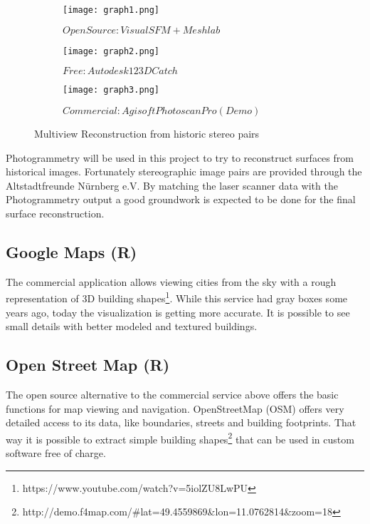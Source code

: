 \begin{figure}[h]
	\centering
	\begin{subfigure}[b]{0.3\textwidth}
		\centering
		\texttt{[image: graph1.png]}
		\caption{$OpenSource: Visual SFM + Meshlab$}
		\label{fig:visualsfm meshlab}
	\end{subfigure}
	\hfill
	\begin{subfigure}[b]{0.3\textwidth}
		\centering
		\texttt{[image: graph2.png]}
		\caption{$Free: Autodesk 123D Catch$}
		\label{fig:123dcatch}
	\end{subfigure}
	\hfill
	\begin{subfigure}[b]{0.3\textwidth}
		\centering
		\texttt{[image: graph3.png]}
		\caption{$Commercial: Agisoft Photoscan Pro (Demo)$}
		\label{fig:photoscan pro}
	\end{subfigure}
	\caption{Multiview Reconstruction from historic stereo pairs}
	\label{fig:multiview reconstruction historic stereo}
\end{figure}

Photogrammetry will be used in this project to try to reconstruct surfaces from historical images. Fortunately stereographic image pairs are provided through the Altstadtfreunde Nürnberg e.V. By matching the laser scanner data with the Photogrammetry output a good groundwork is expected to be done for the final surface reconstruction.

\subsection{Google Maps (R) }

The commercial application allows viewing cities from the sky with a rough representation of 3D building shapes\footnote{https://www.youtube.com/watch?v=5iolZU8LwPU}. While this service had gray boxes some years ago, today the visualization is getting more accurate. It is possible to see small details with better modeled and textured buildings.

\subsection{Open Street Map (R) }

The open source alternative to the commercial service above offers the basic functions for map viewing and navigation. OpenStreetMap (OSM) offers very detailed access to its data, like boundaries, streets and building footprints. That way it is possible to extract simple building shapes\footnote{http://demo.f4map.com/\#lat=49.4559869\&lon=11.0762814\&zoom=18} that can be used in custom software free of charge.

